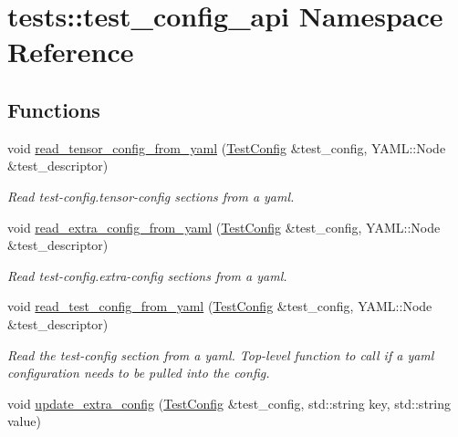 \hypertarget{namespacetests_1_1test__config__api}{}\section{tests\+:\+:test\+\_\+config\+\_\+api Namespace Reference}
\label{namespacetests_1_1test__config__api}
\subsection*{Functions}
\begin{DoxyCompactItemize}
\item 
void \hyperlink{namespacetests_1_1test__config__api_a3c68a5d0f35112a785ff8dea44d7d1e7}{read\+\_\+tensor\+\_\+config\+\_\+from\+\_\+yaml} (\hyperlink{structtests_1_1TestConfig}{Test\+Config} \&test\+\_\+config, Y\+A\+M\+L\+::\+Node \&test\+\_\+descriptor)
\begin{DoxyCompactList}\small\item\em Read test-\/config.\+tensor-\/config sections from a yaml. \end{DoxyCompactList}\item 
void \hyperlink{namespacetests_1_1test__config__api_a535396ca6d07ebe33c1232eda6bded29}{read\+\_\+extra\+\_\+config\+\_\+from\+\_\+yaml} (\hyperlink{structtests_1_1TestConfig}{Test\+Config} \&test\+\_\+config, Y\+A\+M\+L\+::\+Node \&test\+\_\+descriptor)
\begin{DoxyCompactList}\small\item\em Read test-\/config.\+extra-\/config sections from a yaml. \end{DoxyCompactList}\item 
void \hyperlink{namespacetests_1_1test__config__api_a6c9809f23745f5da467bfbe2a866c4a8}{read\+\_\+test\+\_\+config\+\_\+from\+\_\+yaml} (\hyperlink{structtests_1_1TestConfig}{Test\+Config} \&test\+\_\+config, Y\+A\+M\+L\+::\+Node \&test\+\_\+descriptor)
\begin{DoxyCompactList}\small\item\em Read the test-\/config section from a yaml. Top-\/level function to call if a yaml configuration needs to be pulled into the config. \end{DoxyCompactList}\item 
void \hyperlink{namespacetests_1_1test__config__api_a6907c47ab33d9fc64929313ace78cd37}{update\+\_\+extra\+\_\+config} (\hyperlink{structtests_1_1TestConfig}{Test\+Config} \&test\+\_\+config, std\+::string key, std\+::string value)

\end{DoxyCompactItemize}
